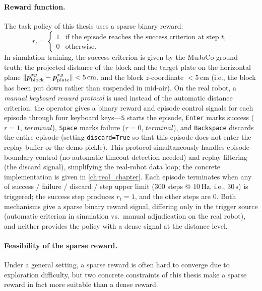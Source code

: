 \paragraph{Reward function.} The task policy of this thesis uses a sparse binary reward:
\begin{equation*}
  r_t = \begin{cases}
    1 & \text{if the episode reaches the success criterion at step $t$}, \\
    0 & \text{otherwise}.
  \end{cases}
\end{equation*}
In simulation training, the success criterion is given by the MuJoCo ground truth: the projected distance of the block and the target plate on the horizontal plane $\lVert \bm{p}_\text{block}^{xy} - \bm{p}_\text{plate}^{xy}\rVert < 5\,\text{cm}$, and the block $z$-coordinate $< 5\,\text{cm}$ (i.e., the block has been put down rather than suspended in mid-air). On the real robot, a \emph{manual keyboard reward protocol} is used instead of the automatic distance criterion: the operator gives a binary reward and episode control signals for each episode through four keyboard keys---\texttt{S} starts the episode, \texttt{Enter} marks success ($r=1$, $\textit{terminal}$), \texttt{Space} marks failure ($r=0$, $\textit{terminal}$), and \texttt{Backspace} discards the entire episode (setting \texttt{discard=True} so that this episode does not enter the replay buffer or the demo pickle). This protocol simultaneously handles episode-boundary control (no automatic timeout detection needed) and replay filtering (the discard signal), simplifying the real-robot data loop; the concrete implementation is given in \cref{ch:real_chapter}. Each episode terminates when any of success / failure / discard / step upper limit ($300$ steps @ $10\,\text{Hz}$, i.e., $30\,\text{s}$) is triggered; the success step produces $r_t = 1$, and the other steps are $0$. Both mechanisms give a sparse binary reward signal, differing only in the trigger source (automatic criterion in simulation vs.\ manual adjudication on the real robot), and neither provides the policy with a dense signal at the distance level.

\paragraph{Feasibility of the sparse reward.} Under a general setting, a sparse reward is often hard to converge due to exploration difficulty, but two concrete constraints of this thesis make a sparse reward in fact more suitable than a dense reward.

